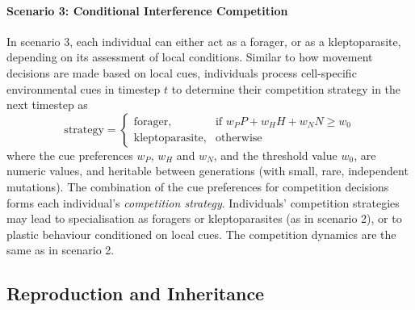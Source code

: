 \begin{refsection}[sorting=nyt]
\paragraph{Scenario 3: Conditional Interference Competition}

In scenario 3, each individual can either act as a forager, or as a kleptoparasite, depending on its assessment of local conditions.
Similar to how movement decisions are made based on local cues, individuals process cell-specific environmental cues in timestep $t$ to determine their competition strategy in the next timestep as
\begin{equation}
    \text{strategy} = 
\begin{cases}
    \text{forager},& \text{if } w_PP + w_HH + w_NN \geq w_0\\
    \text{kleptoparasite},              & \text{otherwise}
\end{cases}
\end{equation}  
where the cue preferences $w_P$, $w_H$ and $w_N$, and the threshold value $w_0$, are numeric values, and heritable between generations (with small, rare, independent mutations).
The combination of the cue preferences for competition decisions forms each individual's \textit{competition strategy}.
Individuals' competition strategies may lead to specialisation as foragers or kleptoparasites (as in scenario 2), or to plastic behaviour conditioned on local cues.
The competition dynamics are the same as in scenario 2.

\subsection*{Reproduction and Inheritance}


\end{refsection}
